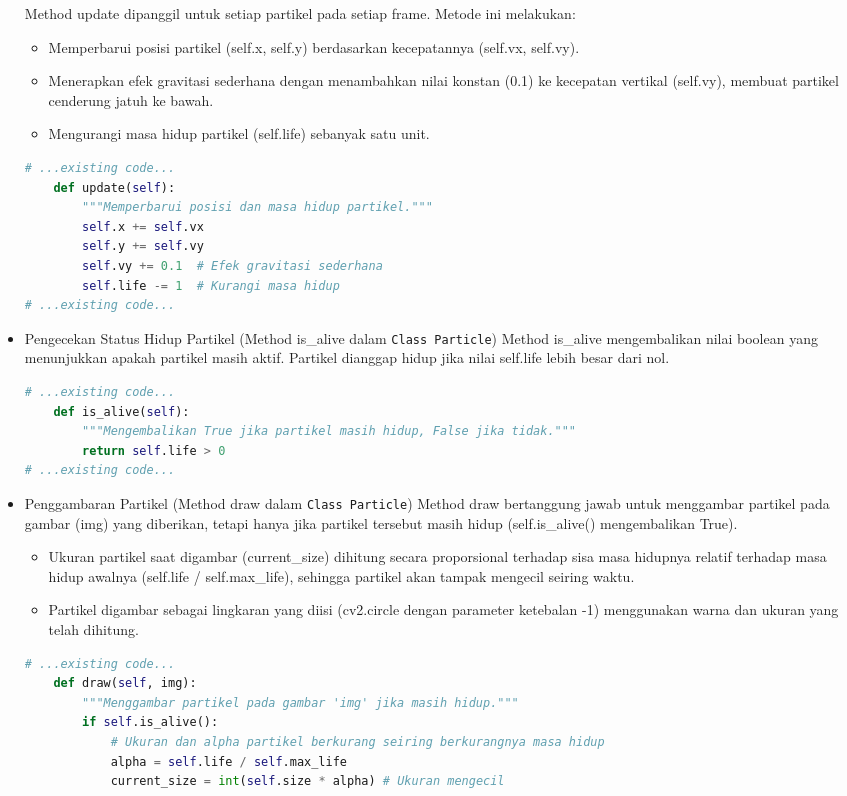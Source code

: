 \documentclass[11pt,a4paper]{article}
\begin{document}
\begin{itemize}
\newline Method update dipanggil untuk setiap partikel pada setiap frame. Metode ini melakukan:
\begin{itemize}
\item Memperbarui posisi partikel (self.x, self.y) berdasarkan kecepatannya (self.vx, self.vy).
\item Menerapkan efek gravitasi sederhana dengan menambahkan nilai konstan (0.1) ke kecepatan vertikal (self.vy), membuat partikel cenderung jatuh ke bawah.
\item Mengurangi masa hidup partikel (self.life) sebanyak satu unit.
\end{itemize}
\begin{lstlisting}[language=Python, caption=Method update]
# ...existing code...
    def update(self):
        """Memperbarui posisi dan masa hidup partikel."""
        self.x += self.vx
        self.y += self.vy
        self.vy += 0.1  # Efek gravitasi sederhana
        self.life -= 1  # Kurangi masa hidup
# ...existing code...
\end{lstlisting}
\item Pengecekan Status Hidup Partikel (Method is\_alive dalam \texttt{Class Particle})
\newline Method is\_alive mengembalikan nilai boolean yang menunjukkan apakah partikel masih aktif. Partikel dianggap hidup jika nilai self.life lebih besar dari nol.
\begin{lstlisting}[language=Python, caption=Method is\_alive]
# ...existing code...
    def is_alive(self):
        """Mengembalikan True jika partikel masih hidup, False jika tidak."""
        return self.life > 0
# ...existing code...
\end{lstlisting}
\item Penggambaran Partikel (Method draw dalam \texttt{Class Particle})
\newline Method draw bertanggung jawab untuk menggambar partikel pada gambar (img) yang diberikan, tetapi hanya jika partikel tersebut masih hidup (self.is\_alive() mengembalikan True).
\begin{itemize}
\item Ukuran partikel saat digambar (current\_size) dihitung secara proporsional terhadap sisa masa hidupnya relatif terhadap masa hidup awalnya (self.life / self.max\_life), sehingga partikel akan tampak mengecil seiring waktu.
\item Partikel digambar sebagai lingkaran yang diisi (cv2.circle dengan parameter ketebalan -1) menggunakan warna dan ukuran yang telah dihitung.
\end{itemize}
\begin{lstlisting}[language=Python, caption=Method draw]
# ...existing code...
    def draw(self, img):
        """Menggambar partikel pada gambar 'img' jika masih hidup."""
        if self.is_alive():
            # Ukuran dan alpha partikel berkurang seiring berkurangnya masa hidup
            alpha = self.life / self.max_life 
            current_size = int(self.size * alpha) # Ukuran mengecil
            

\end{lstlisting}
\end{itemize}
\end{document}
